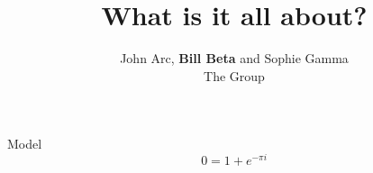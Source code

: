 \documentclass{beamer}
\author[bill.beta@stanford.edu]{ John Arc, \textbf{ Bill Beta } and Sophie Gamma\\
The Group }
\title[What is it all about?]{What is it all about?}
\begin{document}
 

\frame{\titlepage}

\begin{frame}[fragile]{Model}
  \[
  0 = 1 + e^{-\pi i}
  \]
\end{frame}
\end{document}
